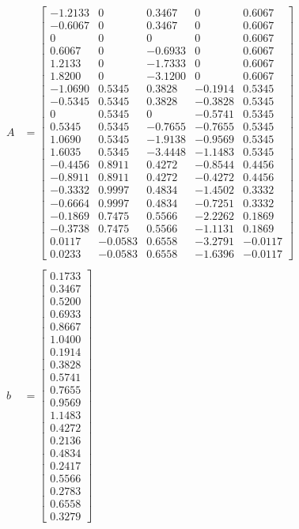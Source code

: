 \documentclass[]{article}
\begin{document}
\begin{align*}
A &=
\begin{bmatrix}
 -1.2133 &        0 &   0.3467 &        0 &   0.6067\\
-0.6067  &       0 &   0.3467  &       0 &   0.6067\\
0   &      0    &     0     &    0 &   0.6067\\
0.6067    &     0  & -0.6933    &     0 &   0.6067\\
1.2133     &    0 &  -1.7333     &    0 &   0.6067\\
1.8200    &     0 &  -3.1200     &    0 &   0.6067\\
-1.0690 &   0.5345  &  0.3828 &  -0.1914 &   0.5345\\
-0.5345  &  0.5345  &  0.3828 &  -0.3828  &  0.5345\\
0  &  0.5345     &    0  & -0.5741   & 0.5345\\
0.5345  &  0.5345 &  -0.7655  & -0.7655  &  0.5345\\
1.0690  &  0.5345 &  -1.9138  & -0.9569  &  0.5345\\
1.6035 &   0.5345&   -3.4448 &  -1.1483  &  0.5345\\
-0.4456 &   0.8911 &   0.4272 &  -0.8544 &   0.4456\\
-0.8911 &   0.8911 &   0.4272 &  -0.4272  &  0.4456\\
-0.3332  &  0.9997 &   0.4834 &  -1.4502  &  0.3332\\
-0.6664  &  0.9997 &   0.4834 &  -0.7251  &  0.3332\\
-0.1869 &   0.7475  &  0.5566 &  -2.2262 &   0.1869\\
-0.3738 &   0.7475 &   0.5566 &  -1.1131  &  0.1869\\
0.0117 &  -0.0583  &  0.6558  & -3.2791 &  -0.0117\\
0.0233 &  -0.0583 &   0.6558 &  -1.6396 &  -0.0117
\end{bmatrix}\\
\\
b &=
\begin{bmatrix}
0.1733\\
0.3467\\
0.5200\\
0.6933\\
0.8667\\
1.0400\\
0.1914\\
0.3828\\
0.5741\\
0.7655\\
0.9569\\
1.1483\\
0.4272\\
0.2136\\
0.4834\\
0.2417\\
0.5566\\
0.2783\\
0.6558\\
0.3279
\end{bmatrix}\\
\end{align*}
\end{document}
